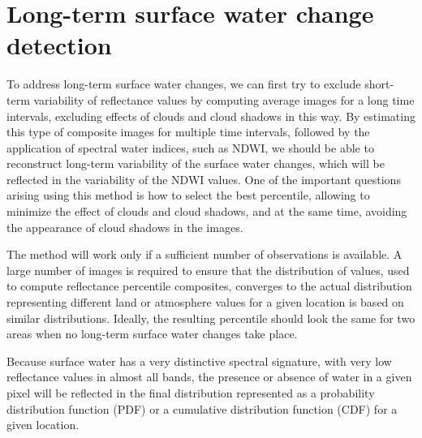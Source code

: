 \section{Long-term surface water change detection}

To address long-term surface water changes, we can first try to exclude short-term variability of reflectance values by computing average images for a long time intervals, excluding effects of clouds and cloud shadows in this way. By estimating this type of composite images for multiple time intervals, followed by the application of spectral water indices, such as \gls{NDWI}, we should be able to reconstruct long-term variability of the surface water changes, which will be reflected in the variability of the \gls{NDWI} values. One of the important questions arising using this method is how to select the best percentile, allowing to minimize the effect of clouds and cloud shadows, and at the same time, avoiding the appearance of cloud shadows in the images. 

The method will work only if a sufficient number of observations is available. A large number of images is required to ensure that the distribution of values, used to compute reflectance percentile composites, converges to the actual distribution representing different land or atmosphere values for a given location  is based on similar distributions. Ideally, the resulting percentile should look the same for two areas when no long-term surface water changes take place. 

Because surface water has a very distinctive spectral signature, with very low reflectance values in almost all bands, the presence or absence of water in a given pixel will be reflected in the final distribution represented as a probability distribution function (PDF) or a cumulative distribution function (CDF) for a given location.



